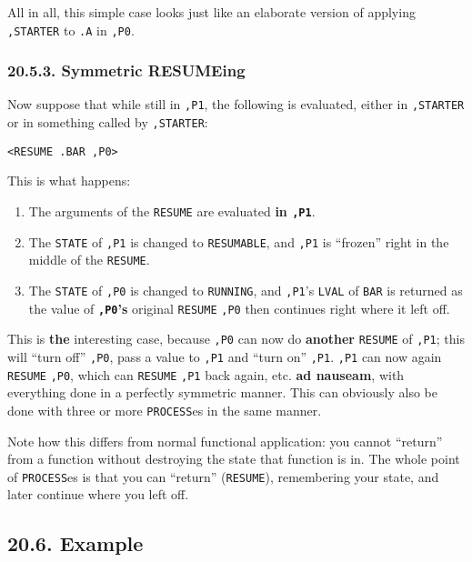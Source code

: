 \documentclass[a4paper,]{article}
\providecommand{\tightlist}{%
  \setlength{\itemsep}{0pt}\setlength{\parskip}{0pt}}
\begin{document}
All in all, this simple case looks just like an elaborate version of applying \texttt{,STARTER} to \texttt{.A} in
\texttt{,P0}.

\subsubsection{20.5.3. Symmetric RESUMEing}\label{symmetric-resumeing}

Now suppose that while still in \texttt{,P1}, the following is evaluated, either in \texttt{,STARTER} or in something
called by \texttt{,STARTER}:

\begin{verbatim}
<RESUME .BAR ,P0>
\end{verbatim}

This is what happens:

\begin{enumerate}
\def\labelenumi{\arabic{enumi}.}
\tightlist
\item
  The arguments of the \texttt{RESUME} are evaluated \textbf{in \texttt{,P1}}.
\item
  The \texttt{STATE} of \texttt{,P1} is changed to \texttt{RESUMABLE}, and \texttt{,P1} is ``frozen'' right in the middle
  of the \texttt{RESUME}.
\item
  The \texttt{STATE} of \texttt{,P0} is changed to \texttt{RUNNING}, and \texttt{,P1}'s \texttt{LVAL} of \texttt{BAR} is
  returned as the value of \textbf{\texttt{,P0}'s} original \texttt{RESUME} \texttt{,P0} then continues right where it left
  off.
\end{enumerate}

This is \textbf{the} interesting case, because \texttt{,P0} can now do \textbf{another} \texttt{RESUME} of \texttt{,P1};
this will ``turn off'' \texttt{,P0}, pass a value to \texttt{,P1} and ``turn on'' \texttt{,P1}. \texttt{,P1} can now again
\texttt{RESUME} \texttt{,P0}, which can \texttt{RESUME} \texttt{,P1} back again, etc. \textbf{ad nauseam}, with everything
done in a perfectly symmetric manner. This can obviously also be done with three or more \texttt{PROCESS}es in the same
manner.

Note how this differs from normal functional application: you cannot ``return'' from a function without destroying the
state that function is in. The whole point of \texttt{PROCESS}es is that you can ``return'' (\texttt{RESUME}), remembering
your state, and later continue where you left off.

\subsection{20.6. Example}\label{example-1}
\end{document}
